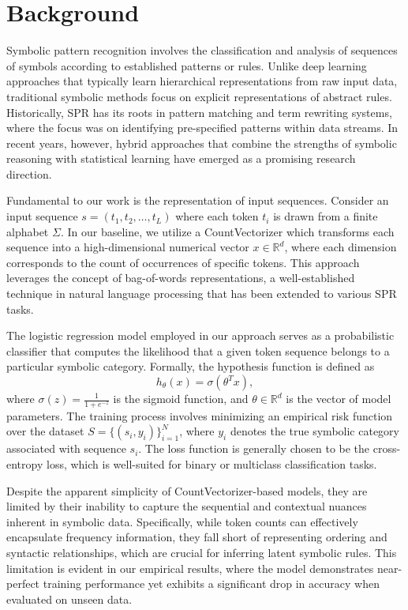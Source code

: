 \documentclass{article}
\begin{document}
\section{Background}
Symbolic pattern recognition involves the classification and analysis of sequences of symbols according to established patterns or rules. Unlike deep learning approaches that typically learn hierarchical representations from raw input data, traditional symbolic methods focus on explicit representations of abstract rules. Historically, SPR has its roots in pattern matching and term rewriting systems, where the focus was on identifying pre-specified patterns within data streams. In recent years, however, hybrid approaches that combine the strengths of symbolic reasoning with statistical learning have emerged as a promising research direction.

Fundamental to our work is the representation of input sequences. Consider an input sequence \( s = (t_1, t_2, \ldots, t_L) \) where each token \( t_i \) is drawn from a finite alphabet \(\Sigma\). In our baseline, we utilize a CountVectorizer which transforms each sequence into a high-dimensional numerical vector \( x \in \mathbb{R}^d \), where each dimension corresponds to the count of occurrences of specific tokens. This approach leverages the concept of bag-of-words representations, a well-established technique in natural language processing that has been extended to various SPR tasks.

The logistic regression model employed in our approach serves as a probabilistic classifier that computes the likelihood that a given token sequence belongs to a particular symbolic category. Formally, the hypothesis function is defined as
\[
h_\theta(x) = \sigma(\theta^T x),
\]
where \(\sigma(z) = \frac{1}{1+e^{-z}}\) is the sigmoid function, and \(\theta \in \mathbb{R}^d\) is the vector of model parameters. The training process involves minimizing an empirical risk function over the dataset \( S = \{(s_i, y_i)\}_{i=1}^N \), where \( y_i \) denotes the true symbolic category associated with sequence \( s_i \). The loss function is generally chosen to be the cross-entropy loss, which is well-suited for binary or multiclass classification tasks.

Despite the apparent simplicity of CountVectorizer-based models, they are limited by their inability to capture the sequential and contextual nuances inherent in symbolic data. Specifically, while token counts can effectively encapsulate frequency information, they fall short of representing ordering and syntactic relationships, which are crucial for inferring latent symbolic rules. This limitation is evident in our empirical results, where the model demonstrates near-perfect training performance yet exhibits a significant drop in accuracy when evaluated on unseen data.
\end{document}
